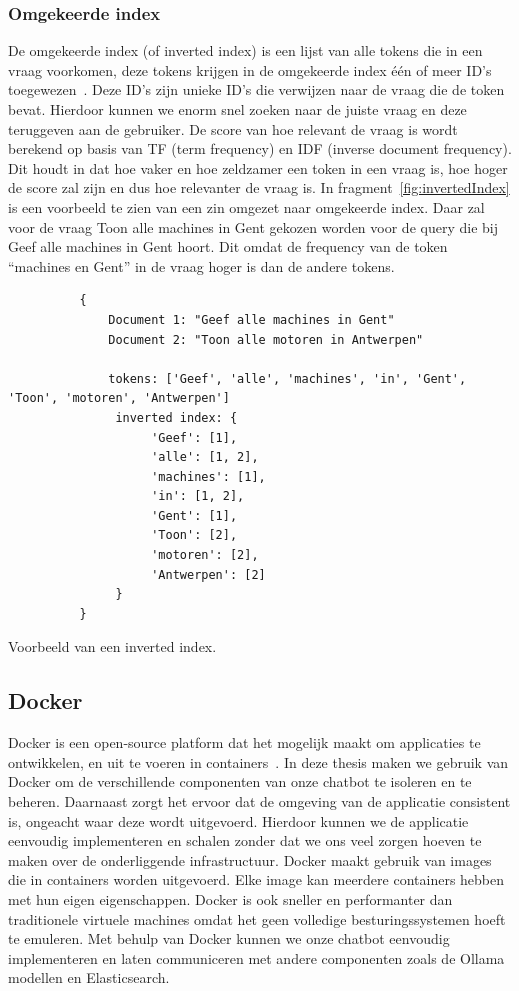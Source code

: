 \subsubsection{Omgekeerde index}
De omgekeerde index (of inverted index) is een lijst van alle tokens die in een vraag voorkomen, deze tokens krijgen in de omgekeerde index één of meer ID's toegewezen~\autocite{Vatsya2024}.
Deze ID's zijn unieke ID's die verwijzen naar de vraag die de token bevat. Hierdoor kunnen we enorm snel zoeken naar de juiste vraag en deze teruggeven aan de gebruiker.
De score van hoe relevant de vraag is wordt berekend op basis van TF (term frequency) en IDF (inverse document frequency).
Dit houdt in dat hoe vaker en hoe zeldzamer een token in een vraag is, hoe hoger de score zal zijn en dus hoe relevanter de vraag is.
In fragment~\ref{fig:invertedIndex} is een voorbeeld te zien van een zin omgezet naar omgekeerde index. 
Daar zal voor de vraag Toon alle machines in Gent gekozen worden voor de query die bij Geef alle machines in Gent hoort.
Dit omdat de frequency van de token ``machines en Gent'' in de vraag hoger is dan de andere tokens.

\begin{listing}[H]
     \begin{verbatim}
          {
              Document 1: "Geef alle machines in Gent"
              Document 2: "Toon alle motoren in Antwerpen"

              tokens: ['Geef', 'alle', 'machines', 'in', 'Gent', 'Toon', 'motoren', 'Antwerpen']
               inverted index: {
                    'Geef': [1],
                    'alle': [1, 2],
                    'machines': [1],
                    'in': [1, 2],
                    'Gent': [1],
                    'Toon': [2],
                    'motoren': [2],
                    'Antwerpen': [2]
               }
          }
     \end{verbatim}
     \caption[Voorbeeld inverted index]{\label{fig:invertedIndex}Voorbeeld van een inverted index.}
\end{listing}

\subsection{Docker}
Docker is een open-source platform dat het mogelijk maakt om applicaties te ontwikkelen, en uit te voeren in containers~\autocite{docker2025}.
In deze thesis maken we gebruik van Docker om de verschillende componenten van onze chatbot te isoleren en te beheren.
Daarnaast zorgt het ervoor dat de omgeving van de applicatie consistent is, ongeacht waar deze wordt uitgevoerd.
Hierdoor kunnen we de applicatie eenvoudig implementeren en schalen zonder dat we ons veel zorgen hoeven te maken over de onderliggende infrastructuur.
Docker maakt gebruik van images die in containers worden uitgevoerd. Elke image kan meerdere containers hebben met hun eigen eigenschappen.
Docker is ook sneller en performanter dan traditionele virtuele machines omdat het geen volledige besturingssystemen hoeft te emuleren.
Met behulp van Docker kunnen we onze chatbot eenvoudig implementeren en laten communiceren met andere componenten zoals de Ollama modellen en Elasticsearch.

